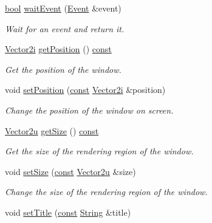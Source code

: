 \begin{DoxyCompactItemize}
\hyperlink{term__entry_8h_a002004ba5d663f149f6c38064926abac}{bool} \hyperlink{classsf_1_1_window_aaf02ab64fbc1d374eef3696df54137bc}{wait\-Event} (\hyperlink{classsf_1_1_event}{Event} \&event)
\begin{DoxyCompactList}\small\item\em Wait for an event and return it. \end{DoxyCompactList}\item 
\hyperlink{namespacesf_a0eed58bf66694ebbc55f72ca7de840d9}{Vector2i} \hyperlink{classsf_1_1_window_a2e6bc12612ea289afea8268fe37c8678}{get\-Position} () \hyperlink{term__entry_8h_a57bd63ce7f9a353488880e3de6692d5a}{const} 
\begin{DoxyCompactList}\small\item\em Get the position of the window. \end{DoxyCompactList}\item 
void \hyperlink{classsf_1_1_window_a6c4078bfbf61c29bfc4b4732ce764f17}{set\-Position} (\hyperlink{term__entry_8h_a57bd63ce7f9a353488880e3de6692d5a}{const} \hyperlink{namespacesf_a0eed58bf66694ebbc55f72ca7de840d9}{Vector2i} \&position)
\begin{DoxyCompactList}\small\item\em Change the position of the window on screen. \end{DoxyCompactList}\item 
\hyperlink{namespacesf_a41039649eb65ea7646e2b97cfe124b4f}{Vector2u} \hyperlink{classsf_1_1_window_ad2b55a731ba1680fe67292991ef1610e}{get\-Size} () \hyperlink{term__entry_8h_a57bd63ce7f9a353488880e3de6692d5a}{const} 
\begin{DoxyCompactList}\small\item\em Get the size of the rendering region of the window. \end{DoxyCompactList}\item 
void \hyperlink{classsf_1_1_window_ab94ea32f22d15c0df11588e319de2546}{set\-Size} (\hyperlink{term__entry_8h_a57bd63ce7f9a353488880e3de6692d5a}{const} \hyperlink{namespacesf_a41039649eb65ea7646e2b97cfe124b4f}{Vector2u} \&size)
\begin{DoxyCompactList}\small\item\em Change the size of the rendering region of the window. \end{DoxyCompactList}\item 
void \hyperlink{classsf_1_1_window_a3b3f3513bb6be90f5cd456c20b5fd5fa}{set\-Title} (\hyperlink{term__entry_8h_a57bd63ce7f9a353488880e3de6692d5a}{const} \hyperlink{classsf_1_1_string}{String} \&title)

\end{DoxyCompactItemize}
